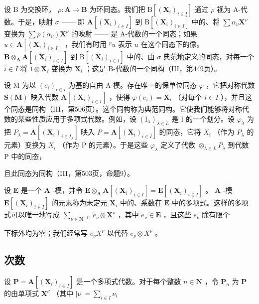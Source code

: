 设 B 为交换环， \(\rho: \mathbf{A} \to \mathbf{B}\) 为环同态。我们把 \(\mathrm{B}[(\mathbf{X}_i)_{i \in I}]\) 通过 \(\rho\) 视为 A-代数。于是，映射 \(\sigma\) —— 即 \(\mathbf{A}[(\mathbf{X}_i)_{i \in I}]\) 到 \(\mathrm{B}[(\mathbf{X}_i)_{i \in I}]\) 中的、将 \(\sum \alpha_\nu \mathbf{X}^\nu\) 变换为 \(\sum \rho(\alpha_\nu) \mathbf{X}^\nu\) 的映射 —— 是 A-代数的一个同态；如果 \(u \in \mathbf{A}[(\mathbf{X}_i)_{i \in I}]\) ，我们有时用 \(^p u\) 表示 \(u\) 在这个同态下的像。 \(\mathbf{B} \otimes_{\mathbf{A}} \mathbf{A}[(\mathbf{X}_i)_{i \in I}]\) 到 \(\mathrm{B}[(\mathbf{X}_i)_{i \in I}]\) 中的、由 \(\sigma\) 典范地定义的同态，对每一个 \(i \in I\) 将 \(1 \otimes \mathbf{X}_i\) 变换为 \(\mathbf{X}_i\) ；这是 B-代数的一个同构（III，第449页）。

设 M 为以 \((e_{i})_{i\in I}\) 为基的自由 A-模。存在唯一的保单位同态 \(\varphi\) ，它把对称代数 \(\mathbf{S}(\mathbf{M})\) 映入代数 \(\mathbf{A}[(\mathbf{X}_{i})_{i\in I}]\) ，使得 \(\varphi(e_{i})=\mathbf{X}_{i}\) （对每个 \(i\in I\) ），并且这个同态是同构（III，第506页）。这个同构称为典范同构。它使我们能够将对称代数的某些性质应用于多项式代数。例如，设 \((\mathrm{I}_{\lambda})_{\lambda\in L}\) 是 I 的一个划分。设 \(\varphi_{\lambda}\) 为把 \(P_{\lambda}=\mathbf{A}[(\mathbf{X}_{i})_{i\in I_{\lambda}}]\) 映入 \(P=\mathbf{A}[(\mathbf{X}_{i})_{i\in I}]\) 的同态，它将 \(X_{i}\) （作为 \(P_{\lambda}\) 的元素）变换为 \(X_{i}\) （作为 P 的元素）。于是这些 \(\varphi_{\lambda}\) 定义了代数 \(\otimes_{\lambda\in L}P_{\lambda}\) 到代数 P 中的同态，

且此同态为同构（III，第503页，命题9）。

设 \(\mathbf{E}\) 是一个 \(\mathbf{A}\) -模，并令 \(\mathbf{E} \otimes_{\mathbf{A}} \mathbf{A}[(\mathbf{X}_i)_{i \in I}] = \mathbf{E}[(\mathbf{X}_i)_{i \in I}]\) 。 \(\mathbf{A}\) -模 \(\mathbf{E}[(\mathbf{X}_i)_{i \in I}]\) 的元素称为未定元 \(\mathbf{X}_i\) 中的、系数在 \(\mathbf{E}\) 中的多项式。这样的多项式可以唯一地写成 \(\sum_{\nu \in \mathbf{N}^{(I)}} e_\nu \otimes \mathbf{X}^\nu\) ，其中 \(e_\nu \in \mathbf{E}\) ，且这些 \(e_\nu\) 除有限个

下标外均为零；我们经常写 \(e_{\nu}X^{\nu}\) 以代替 \(e_{\nu}\otimes X^{\nu}\) 。

\subsection{次数}

设 \(\mathbf{P} = \mathbf{A}[(\mathbf{X}_i)_{i\in I}]\) 是一个多项式代数。对于每个整数 \(n\in \mathbf{N}\) ，令 \(\mathbf{P}_n\) 为 \(\mathbf{P}\) 的由单项式 \(\mathbf{X}^{\nu}\) （其中 \(|\nu| = \sum_{i\in I}\nu_i\)

